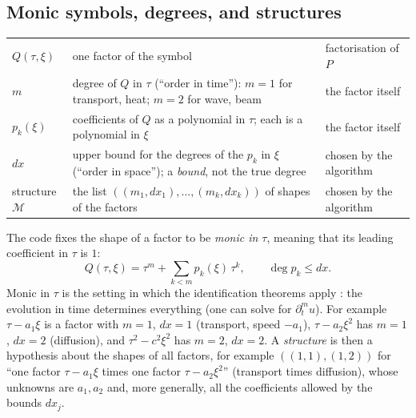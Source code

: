 \subsection{Monic symbols, degrees, and structures}
\begin{symbols}
\begin{tabular}{@{}L{2.3cm}L{6.2cm}L{4.5cm}@{}}
$Q(\tau,\xi)$ & one factor of the symbol & factorisation of $P$\\
$m$ & degree of $Q$ in $\tau$ (``order in time''): $m=1$ for transport, heat; $m=2$ for wave, beam & the factor itself\\
$p_k(\xi)$ & coefficients of $Q$ as a polynomial in $\tau$; each is a polynomial in $\xi$ & the factor itself\\
$dx$ & upper bound for the degrees of the $p_k$ in $\xi$ (``order in space''); a \emph{bound}, not the true degree & chosen by the algorithm\\
structure $\mathcal M$ & the list $((m_1,dx_1),\dots,(m_k,dx_k))$ of shapes of the factors & chosen by the algorithm\\
\end{tabular}
\end{symbols}
The code fixes the shape of a factor to be \emph{monic in $\tau$}, meaning that its leading coefficient in $\tau$ is $1$:
\begin{equation}\label{eq:monic}
Q(\tau,\xi)=\tau^m+\sum_{k<m}p_k(\xi)\,\tau^k,\qquad \deg p_k\le dx .
\end{equation}
Monic in $\tau$ is the setting in which the identification theorems apply : the evolution in time determines everything (one can solve for $\partial_t^mu$). For example $\tau-a_1\xi$ is a factor with $m=1$, $dx=1$ (transport, speed $-a_1$), $\tau-a_2\xi^2$ has $m=1$, $dx=2$ (diffusion), and $\tau^2-c^2\xi^2$ has $m=2$, $dx=2$. A \emph{structure} is then a hypothesis about the shapes of all factors, for example $((1,1),(1,2))$ for ``one factor $\tau-a_1\xi$ times one factor $\tau-a_2\xi^2$'' (transport times diffusion), whose unknowns are $a_1,a_2$ and, more generally, all the coefficients allowed by the bounds $dx_j$.

